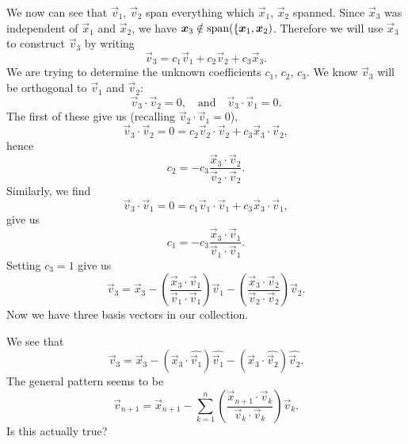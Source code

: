We now can see that $\vec{v}_{1}$, $\vec{v}_{2}$ span everything which
$\vec{x}_{1}$, $\vec{x}_{2}$ spanned. Since $\vec{x}_{3}$ was
independent of $\vec{x}_{1}$ and $\vec{x}_{2}$, we have
$\boldsymbol{x}_{3}\notin\operatorname{span}(\{\boldsymbol{x}_{1},\boldsymbol{x}_{2})$. Therefore we will
use $\vec{x}_{3}$ to construct $\vec{v}_{3}$ by writing
\begin{equation}
  \vec{v}_{3} = c_{1}\vec{v}_{1} + c_{2}\vec{v}_{2} + c_{3}\vec{x}_{3}.
\end{equation}
We are trying to determine the unknown coefficients $c_{1}$, $c_{2}$,
$c_{3}$. We know $\vec{v}_{3}$ will be orthogonal to $\vec{v}_{1}$ and
$\vec{v}_{2}$:
\begin{equation}
\vec{v}_{3}\cdot\vec{v}_{2}=0,\quad\mbox{and}\quad\vec{v}_{3}\cdot\vec{v}_{1}=0.
\end{equation}
The first of these give us (recalling $\vec{v}_{2}\cdot\vec{v}_{1}=0$),
\begin{equation}
\vec{v}_{3}\cdot\vec{v}_{2} = 0 = c_{2}\vec{v}_{2}\cdot\vec{v}_{2} + c_{3}\vec{x}_{3}\cdot\vec{v}_{2},
\end{equation}
hence
\begin{equation}
c_{2} = -c_{3}\frac{\vec{x}_{3}\cdot\vec{v}_{2}}{\vec{v}_{2}\cdot\vec{v}_{2}}.
\end{equation}
Similarly, we find
\begin{equation}
\vec{v}_{3}\cdot\vec{v}_{1} = 0 = c_{1}\vec{v}_{1}\cdot\vec{v}_{1} + c_{3}\vec{x}_{3}\cdot\vec{v}_{1},
\end{equation}
give us
\begin{equation}
c_{1} = -c_{3}\frac{\vec{x}_{3}\cdot\vec{v}_{1}}{\vec{v}_{1}\cdot\vec{v}_{1}}.
\end{equation}
Setting $c_{3}=1$ give us
\begin{equation}
\vec{v}_{3} = \vec{x}_{3} - \left(\frac{\vec{x}_{3}\cdot\vec{v}_{1}}{\vec{v}_{1}\cdot\vec{v}_{1}}\right)\vec{v}_{1}
-\left(\frac{\vec{x}_{3}\cdot\vec{v}_{2}}{\vec{v}_{2}\cdot\vec{v}_{2}}\right)\vec{v}_{2}.
\end{equation}
Now we have three basis vectors in our collection.

We see that
\begin{equation}
\vec{v}_{3} = \vec{x}_{3} - (\vec{x}_{3}\cdot\widehat{\vec{v}_{1}})\widehat{\vec{v}_{1}} - (\vec{x}_{3}\cdot\widehat{\vec{v}_{2}})\widehat{\vec{v}_{2}}.
\end{equation}
The general pattern seems to be
\begin{equation}
\vec{v}_{n+1} = \vec{x}_{n+1} - \sum^{n}_{k=1}\left(\frac{\vec{x}_{n+1}\cdot\vec{v}_{k}}{\vec{v}_{k}\cdot\vec{v}_{k}}\right)\vec{v}_{k}.
\end{equation}
Is this actually true?

